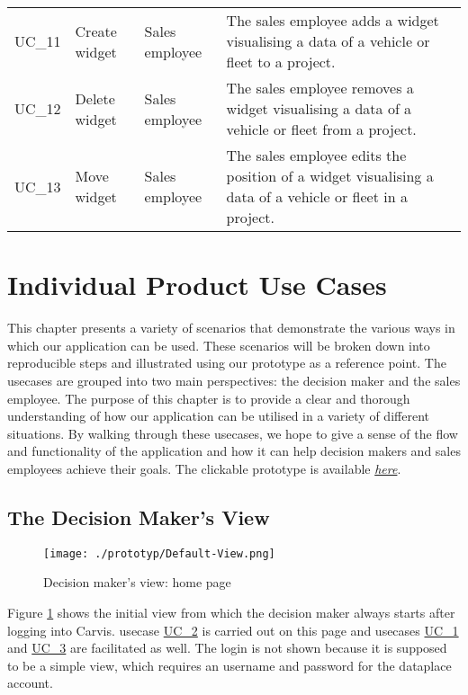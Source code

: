 \begin{footnotesize}
\begin{longtable}[i i i L]{ p{} p{} p{} p{} }
    \hypertarget{Ref:UC11}{UC\_11} & Create \gls{widget} & Sales employee & The sales employee adds a \gls{widget} visualising a \gls{data} of a vehicle or fleet to a project.\\
    \hypertarget{Ref:UC12}{UC\_12} & Delete \gls{widget} & Sales employee & The sales employee removes a \gls{widget} visualising a \gls{data} of a vehicle or fleet from a project.\\
    \hypertarget{Ref:UC13}{UC\_13} & Move \gls{widget} & Sales employee & The sales employee edits the position of a \gls{widget} visualising a \gls{data} of a vehicle or fleet in a project.\\
    \bottomrule
  \end{longtable}
\end{footnotesize}
\rmfamily

\section{Individual Product Use Cases}
This chapter presents a variety of scenarios that demonstrate the various ways in which our application can be used. These scenarios will be broken down into reproducible steps and illustrated using our prototype as a reference point. The \glspl{usecase} are grouped into two main perspectives: the decision maker and the sales employee. The purpose of this chapter is to provide a clear and thorough understanding of how our application can be utilised in a variety of different situations. By walking through these \glspl{usecase}, we hope to give a sense of the flow and functionality of the application and how it can help decision makers and sales employees achieve their goals.
The clickable prototype is available \href{https://www.figma.com/proto/QnshySDvR2A5jazPugjKq7/Carvis?scaling=scale-down&show-proto-sidebar=1&node-id=560%3A2807&starting-point-node-id=709%3A5104}{\emph{here}}.

\subsection{The Decision Maker's View}
\begin{figure}[H]
  \centering
  \texttt{[image: ./prototyp/Default-View.png]}
  \caption{Decision maker's view: home page}
  \label{DecisionMaker:Homepage}
\end{figure}

Figure \ref{DecisionMaker:Homepage} shows the initial view from which the decision maker always starts after logging into Carvis. \Gls{usecase} \hyperlink{Ref:UC2}{UC\_2} is carried out on this page and \glspl{usecase} \hyperlink{Ref:UC1}{UC\_1} and \hyperlink{Ref:UC3}{UC\_3} are facilitated as well. The login is not shown because it is supposed to be a simple view, which requires an username and password for the \gls{dataplace} account.


